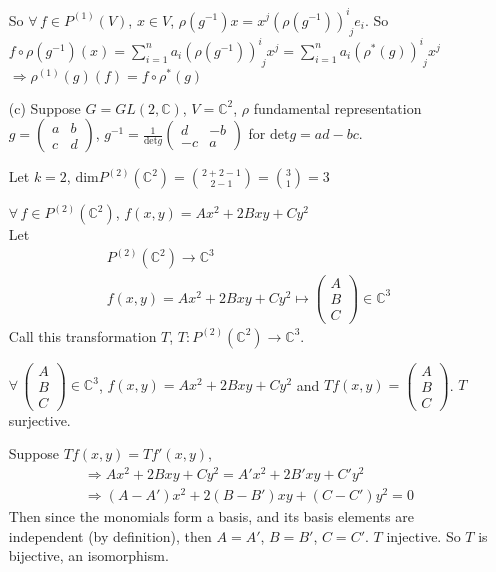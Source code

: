 \documentclass[10pt]{amsart}
\begin{document}
\begin{multicols*}{2}
\begin{enumerate}
So $\forall \, f \in P^{(1)}(V)$, $x\in V$, $\rho(g^{-1})x = x^j(\rho(g^{-1}))^i_{\,\,j} e_i$.  So $f\circ \rho(g^{-1})(x) = \sum_{i=1}^n a_i(\rho(g^{-1}))^i_{\,\,j} x^j = \sum_{i=1}^n a_i(\rho^*(g))^i_{\,\,j} x^j$ \\
$\Longrightarrow \rho^{(1)}(g)(f) = f\circ \rho^*(g)$
\item[(c)] Suppose $G= GL(2,\mathbb{C})$, $V=\mathbb{C}^2$, $\rho$ fundamental representation $g= \left( \begin{matrix} a & b \\
  c & d \end{matrix} \right)$, $g^{-1} = \frac{1}{\text{det}g} \left( \begin{matrix} d & -b \\
  -c & a \end{matrix} \right)$ for $\text{det}g = ad-bc$.  

Let $k=2$, $\text{dim}P^{(2)}(\mathbb{C}^2) = \binom{2+2-1}{2-1} = \binom{3}{1} = 3$

$\forall \, f \in P^{(2)}(\mathbb{C}^2)$, $f(x,y) = Ax^2 + 2Bxy + Cy^2$ \\
Let 
\[
\begin{gathered}
  P^{(2)}(\mathbb{C}^2) \to \mathbb{C}^3 \\ 
  f(x,y) = Ax^2 + 2Bxy + Cy^2 \mapsto \left( \begin{matrix} A \\ B \\ C \end{matrix} \right) \in \mathbb{C}^3
\end{gathered}
\]
Call this transformation $T$, $T: P^{(2)}(\mathbb{C}^2) \to \mathbb{C}^3$.  

$\forall \, \left( \begin{matrix} A \\ B \\ C \end{matrix} \right) \in \mathbb{C}^3$, $f(x,y) = Ax^2 + 2Bxy + Cy^2$ and $Tf(x,y) = \left( \begin{matrix} A \\ B \\ C \end{matrix} \right)$.  $T$ surjective.  

Suppose $Tf(x,y) = Tf'(x,y)$, 
\[
\begin{gathered}
  \Longrightarrow Ax^2 + 2Bxy + Cy^2 = A'x^2 + 2B'xy + C'y^2 \\ 
  \Longrightarrow (A-A')x^2 + 2(B-B')xy + (C-C')y^2 = 0
\end{gathered}
\]
Then since the monomials form a basis, and its basis elements are independent (by definition), then $A=A'$, $B=B'$, $C=C'$.  $T$ injective.  So $T$ is bijective, an isomorphism.  


\end{enumerate}
\end{multicols*}
\end{document}
